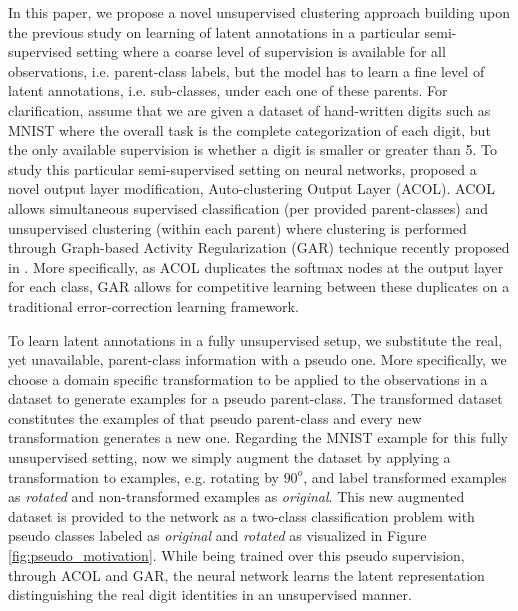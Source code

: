 \documentclass{article} \usepackage{iclr2018_conference,times}
\begin{document}
In this paper, we propose a novel unsupervised clustering approach building upon the previous study on learning of latent annotations in a particular semi-supervised setting where a coarse level of supervision is available for all observations, i.e. parent-class labels, but the model has to learn a fine level of latent annotations, i.e. sub-classes, under each one of these parents. For clarification, assume that we are given a dataset of hand-written digits such as MNIST \citep{lecun1998mnist} where the overall task is the complete categorization of each digit, but the only available supervision is whether a digit is smaller or greater than 5. To study this particular semi-supervised setting on neural networks, \citet{KilincU17ACOL} proposed a novel output layer modification, Auto-clustering Output Layer (ACOL). ACOL allows simultaneous supervised classification (per provided parent-classes) and unsupervised clustering (within each parent) where clustering is performed through Graph-based Activity Regularization (GAR) technique recently proposed in \citet{KilincU17GAR}. More specifically, as ACOL duplicates the softmax nodes at the output layer for each class, GAR allows for competitive learning between these duplicates on a traditional error-correction learning framework. 

To learn latent annotations in a fully unsupervised setup, we substitute the real, yet unavailable, parent-class information with a pseudo one. More specifically, we choose a domain specific transformation to be applied to the observations in a dataset to generate examples for a pseudo parent-class. The transformed dataset constitutes the examples of that pseudo parent-class and every new transformation generates a new one. Regarding the MNIST example for this fully unsupervised setting, now we simply augment the dataset by applying a transformation to examples, e.g. rotating by $90^o$, and label transformed examples as \textit{rotated} and non-transformed examples as \textit{original}. This new augmented dataset is provided to the network as a two-class classification problem with pseudo classes labeled as \textit{original} and \textit{rotated} as visualized in Figure \ref{fig:pseudo_motivation}. While being trained over this pseudo supervision, through ACOL and GAR, the neural network learns the latent representation distinguishing the real digit identities in an unsupervised manner.
\end{document}

